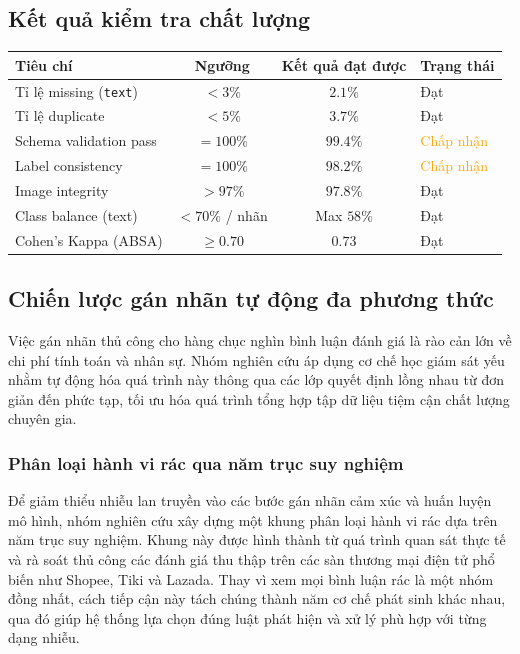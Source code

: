 \subsection{Kết quả kiểm tra chất lượng}

\begin{center}
\renewcommand{\arraystretch}{1.4}
\begin{tabularx}{\textwidth}{|l|c|c|l|}
\hline
\rowcolor[HTML]{E8E8E8}
\textbf{Tiêu chí} & \textbf{Ngưỡng} & \textbf{Kết quả đạt được} & \textbf{Trạng thái} \\
\hline
Tỉ lệ missing (\texttt{text}) & $< 3\%$ & $2.1\%$ & \textcolor{green!60!black}{Đạt} \\
\hline
Tỉ lệ duplicate & $< 5\%$ & $3.7\%$ & \textcolor{green!60!black}{Đạt} \\
\hline
Schema validation pass & $= 100\%$ & $99.4\%$ & \textcolor{orange}{Chấp nhận} \\
\hline
Label consistency & $= 100\%$ & $98.2\%$ & \textcolor{orange}{Chấp nhận} \\
\hline
Image integrity & $> 97\%$ & $97.8\%$ & \textcolor{green!60!black}{Đạt} \\
\hline
Class balance (text) & $< 70\%$ / nhãn & Max $58\%$ & \textcolor{green!60!black}{Đạt} \\
\hline
Cohen's Kappa (ABSA) & $\geq 0.70$ & $0.73$ & \textcolor{green!60!black}{Đạt} \\
\hline
\end{tabularx}
\end{center}

\subsection{Chiến lược gán nhãn tự động đa phương thức}

Việc gán nhãn thủ công cho hàng chục nghìn bình luận đánh giá là rào cản lớn về chi phí tính toán và nhân sự. Nhóm nghiên cứu áp dụng cơ chế học giám sát yếu nhằm tự động hóa quá trình này thông qua các lớp quyết định lồng nhau từ đơn giản đến phức tạp, tối ưu hóa quá trình tổng hợp tập dữ liệu tiệm cận chất lượng chuyên gia.

\subsubsection{Phân loại hành vi rác qua năm trục suy nghiệm} 

Để giảm thiểu nhiễu lan truyền vào các bước gán nhãn cảm xúc và huấn luyện mô hình, nhóm nghiên cứu xây dựng một khung phân loại hành vi rác dựa trên năm trục suy nghiệm. Khung này được hình thành từ quá trình quan sát thực tế và rà soát thủ công các đánh giá thu thập trên các sàn thương mại điện tử phổ biến như Shopee, Tiki và Lazada. Thay vì xem mọi bình luận rác là một nhóm đồng nhất, cách tiếp cận này tách chúng thành năm cơ chế phát sinh khác nhau, qua đó giúp hệ thống lựa chọn đúng luật phát hiện và xử lý phù hợp với từng dạng nhiễu.

